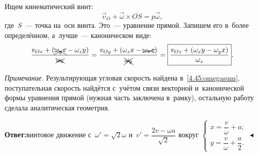 \documentclass{weekly}
\begin{document}
Ищем кинематический винт:
\begin{equation}
    \vec v_O + \vec\omega \times \overline{OS} = p\vec\omega,
\end{equation}
где~$S$~--- точка на~оси винта. Это~--- уравнение прямой.
Запишем его в~более определённом, а~лучше~--- каноническом виде:
\begin{equation}
    \frac{v_{Ox} + \left(\xcancel{\omega_y z} - \omega_z y\right)}
        {\xcancel{\omega_x}} =
    \frac{v_{Oy} + \left(\omega_z x - \xcancel{\omega_x z}\right)}
        {\xcancel{\omega_y}} =
    \boxed{\frac{v_{Oz} + \left(\omega_x y - \omega_y x\right)}
        {\omega_z}}.
\end{equation}

\textsl{Примечание.} Результирующая угловая скорость найдена
в~\eqref{4.45:omegasum}, поступательная скорость найдётся
с~учётом связи векторной и~канонической формы уравнения прямой
(нужная часть заключена в~рамку), остальную работу сделала
аналитическая геометрия.

\textbf{Ответ:}\quad винтовое движение с~$\omega' = \sqrt{2}\omega$
и~$v' = \dfrac{2v - \omega a}{\sqrt{2}}$ вокруг
$
\begin{cases}
    x = \dfrac{v}{\omega} + a; \\[2ex]
    y = \dfrac{v}{\omega} + \dfrac{a}{2}.
\end{cases}
$
\hfill $\blacktriangleleft$
\end{document}
